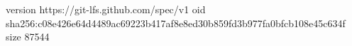 version https://git-lfs.github.com/spec/v1
oid sha256:c08e426e64d4489ac69223b417af8e8ed30b859fd3b977fa0bfcb108e45c634f
size 87544
